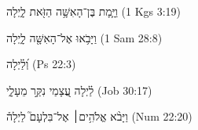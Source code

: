 
\begin{exe}

\ex\label{Ønight_sim_exs1}
\texthebrew{
וַיָּ֛מָת בֶּן־הָאִשָּׁ֥ה הַזֹּ֖את לָ֑יְלָה 
} (1 Kgs 3:19)

\ex\label{Ønight_sim_exs2}
\texthebrew{
וַיָּבֹ֥אוּ אֶל־הָאִשָּׁ֖ה לָ֑יְלָה 
} (1 Sam 28:8)

\ex\label{Ønight_sim_exs3}
\texthebrew{
וְ֝לַ֗יְלָה 
} (Ps 22:3)

\ex\label{Ønight_sim_exs4}
\texthebrew{
לַ֗יְלָה עֲ֭צָמַי נִקַּ֣ר מֵעָלָ֑י 
} (Job 30:17)

\ex\label{Ønight_sim_exs5}
\texthebrew{
וַיָּבֹ֨א אֱלֹהִ֥ים׀ אֶל־בִּלְעָם֮ לַיְלָה֒ 
} (Num 22:20)

\end{exe}

